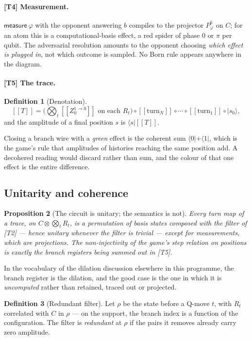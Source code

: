 \documentclass[11pt,a4paper]{article}
\theoremstyle{definition}
\newtheorem{definition}{Definition}[section]
\theoremstyle{plain}
\newtheorem{proposition}[definition]{Proposition}
\newcommand{\Meas}{\textsf{measure}}
\newcommand{\lbr}{[\![}
\newcommand{\rbr}{]\!]}
\newcommand{\gr}[1]{\lbr #1 \rbr}
\begin{document}
\paragraph{[T4] Measurement.}
$\Meas\ \varphi$ with the opponent answering $b$ compiles to the projector
$P_\varphi^b$ on $C$; for an atom this is a computational-basis effect, a red
spider of phase $0$ or $\pi$ per qubit. The adversarial resolution amounts to
the opponent choosing \emph{which effect is plugged in}, not which outcome is
sampled. No Born rule appears anywhere in the diagram.

\paragraph{[T5] The trace.}
\begin{definition}[Denotation]
\[
  \gr{T} = \Big(\textstyle\bigotimes_t \gr{Z^{1\to0}_0} \text{ on each } R_t\Big)
  \circ \gr{\mathrm{turn}_N}\circ\cdots\circ\gr{\mathrm{turn}_1}
  \circ |s_0\rangle ,
\]
and the amplitude of a final position $s$ is $\langle s|\gr{T}$.
\end{definition}
Closing a branch wire with a \emph{green} effect is the coherent sum
$\langle 0| + \langle 1|$, which is the game's rule that amplitudes of histories
reaching the same position add. A decohered reading would discard rather than
sum, and the colour of that one effect is the entire difference.

\subsection{Unitarity and coherence}

\begin{proposition}[The circuit is unitary; the semantics is not]
\label{prop:unitary}
Every turn map of a trace, on $C\otimes\bigotimes_t R_t$, is a permutation of
basis states composed with the filter of [T2] --- hence unitary whenever the
filter is trivial --- except for measurements, which are projections. The
non-injectivity of the game's step relation on positions is exactly the branch
registers being summed out in [T5].
\end{proposition}

In the vocabulary of the dilation discussion elsewhere in this programme, the
branch register is the dilation, and the good case is the one in which it is
\emph{uncomputed} rather than retained, traced out or projected.

\begin{definition}[Redundant filter]
Let $\rho$ be the state before a Q-move $t$, with $R_t$ correlated with $C$ in
$\rho$ --- on the support, the branch index is a function of the configuration.
The filter is \emph{redundant} at $\rho$ if the pairs it removes already carry
zero amplitude.
\end{definition}
\end{document}
